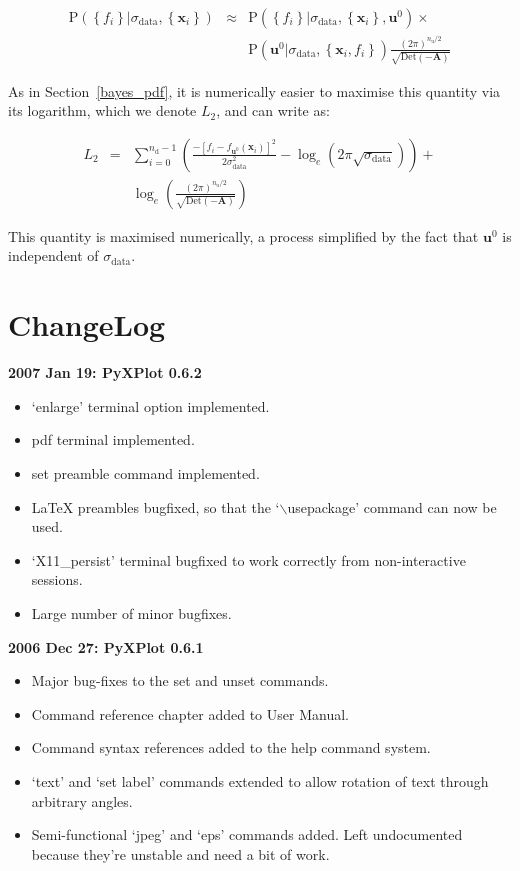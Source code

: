 \documentclass[a4paper,onecolumn,11pt]{book}
\begin{document}
\begin{eqnarray}
\mathrm{P}\left( \left\{ f_i \right\} | \sigma_\mathrm{data}, \left\{ \mathbf{x}_i \right\} \right)
& \approx &
\mathrm{P}\left( \left\{ f_i \right\} | \sigma_\mathrm{data}, \left\{ \mathbf{x}_i \right\}, \mathbf{u}^0 \right)
\times \\
& &
\mathrm{P}\left( \mathbf{u}^0 | \sigma_\mathrm{data}, \left\{ \mathbf{x}_i, f_i \right\} \right)
\frac{
(2\pi)^{n_\mathrm{u}/2}
}{
\sqrt{\mathrm{Det}\left(-\mathbf{A}\right)}
}
\nonumber
\end{eqnarray}

As in Section~\ref{bayes_pdf}, it is numerically easier to maximise this
quantity via its logarithm, which we denote $L_2$, and can write as:

\begin{eqnarray}
L_2 & = &
\sum_{i=0}^{n_\mathrm{d}-1}
\left(
\frac{
-\left[f_i - f_{\mathbf{u}^0}(\mathbf{x}_i)\right]^2
}{
2\sigma_\mathrm{data}^2
}
- \log_e \left(2\pi\sqrt{\sigma_\mathrm{data}} \right)
\right) +
\\ & & \nonumber
\log_e \left(
\frac{
(2\pi)^{n_\mathrm{u}/2}
}{
\sqrt{\mathrm{Det}\left(-\mathbf{A}\right)}
}
\right)
\end{eqnarray}

This quantity is maximised numerically, a process simplified by the fact that
$\mathbf{u}^0$ is independent of $\sigma_\mathrm{data}$.

\chapter{ChangeLog}

\noindent \textbf{2007 Jan 19: PyXPlot 0.6.2}
\begin{itemize}
\item `enlarge' terminal option implemented.
\item pdf terminal implemented.
\item set preamble command implemented.
\item LaTeX preambles bugfixed, so that the `$\backslash$usepackage' command can now be used.
\item `X11\_persist' terminal bugfixed to work correctly from non-interactive sessions.
\item Large number of minor bugfixes.
\end{itemize}

\noindent \textbf{2006 Dec 27: PyXPlot 0.6.1}
\begin{itemize} 
\item Major bug-fixes to the set and unset commands.
\item Command reference chapter added to User Manual.
\item Command syntax references added to the help command system.
\item `text' and `set label' commands extended to allow rotation of text through arbitrary angles.
\item Semi-functional `jpeg' and `eps' commands added. Left undocumented because they're unstable and need a bit of work.
\end{itemize}
\end{document}
